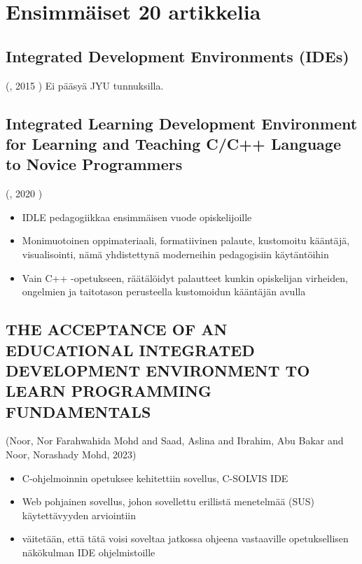 \documentclass[11pt]{article}
\date{\today}
\title{}
\begin{document}
\tableofcontents


\section{Ensimmäiset 20 artikkelia}
\label{sec:org3a84383}

\subsection{Integrated Development Environments (IDEs)}
\label{sec:orga0c16fc}
(,  2015 )
Ei pääsyä JYU tunnuksilla.

\subsection{Integrated Learning Development Environment for Learning and Teaching C/C++ Language to Novice Programmers}
\label{sec:org47e3d38}
(,  2020 )

\begin{itemize}
\item IDLE pedagogiikkaa ensimmäisen vuode opiskelijoille
\item Monimuotoinen oppimateriaali, formatiivinen palaute, kustomoitu
kääntäjä, visualisointi, nämä yhdistettynä moderneihin pedagogisiin
käytäntöihin
\item Vain C++ -opetukseen, räätälöidyt palautteet kunkin opiskelijan
virheiden, ongelmien ja taitotason perusteella kustomoidun kääntäjän
avulla
\end{itemize}


\subsection{THE ACCEPTANCE OF AN EDUCATIONAL INTEGRATED DEVELOPMENT ENVIRONMENT TO LEARN PROGRAMMING FUNDAMENTALS}
\label{sec:org3b1d145}
(Noor, Nor Farahwahida Mohd and Saad, Aslina and Ibrahim, Abu Bakar and Noor, Norashady Mohd, 2023)

\begin{itemize}
\item C-ohjelmoinnin opetuksee kehitettiin sovellus, C-SOLVIS IDE
\item Web pohjainen sovellus, johon sovellettu erillistä menetelmää
(SUS) käytettävyyden arviointiin
\item väitetään, että tätä voisi soveltaa jatkossa ohjeena vastaaville
opetuksellisen näkökulman IDE ohjelmistoille
\end{itemize}
\end{document}
